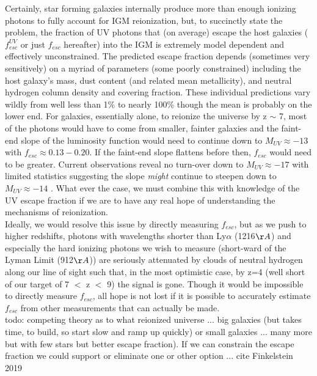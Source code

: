 \documentclass{aastex62}
\begin{document}
Certainly, star forming galaxies internally produce more than enough ionizing photons to fully account for IGM reionization, but, to succinctly state the problem, the fraction of UV photons that (on average) escape the host galaxies ($f^{UV}_{esc}$ or just $f_{esc}$ hereafter) into the IGM is extremely model dependent and effectively unconstrained. The predicted escape fraction depends (sometimes very sensitively) on a myriad of parameters (some poorly constrained) including the host galaxy's mass, dust content (and related mean metallicity), and neutral hydrogen column density and covering fraction. These individual predictions vary wildly from well less than 1\% to nearly 100\% \cite{Zackrisson} though the mean is probably on the lower end. For galaxies, essentially alone, to reionize the universe by z $\sim$ 7, most of the photons would have to come from smaller, fainter galaxies and the faint-end slope of the luminosity function would need to continue down to $M_{UV} \approx -13$ with $f_{esc} \approx 0.13 - 0.20$. If the faint-end slope flattens before then, $f_{esc}$ would need to be greater. Current observations reveal no turn-over down to $M_{UV} \approx -17$ with limited statistics suggesting the slope \textit{might} continue to steepen down to $M_{UV} \approx -14$ \cite{Livermore}. What ever the case, we must combine this with knowledge of the UV escape fraction if we are to have any real hope of understanding the mechanisms of reionization.\\

Ideally, we would resolve this issue by directly measuring $f_{esc}$, but as we push to higher redshifts, photons with wavelengths shorter than Ly$\alpha$ (1216$\AA$) and especially the hard ionizing photons we wish to measure (short-ward of the Lyman Limit (912$\AA$)) are seriously attenuated by clouds of neutral hydrogen along our line of sight such that, in the most optimistic case, by z=4 (well short of our target of 7 $<$ z $<$ 9) the signal is gone. Though it would be impossible to directly measure $f_{esc}$, all hope is not lost if it is possible to accurately estimate $f_{esc}$ from other measurements that can actually be made.\\

{ \color{red} todo: competing theory as to what reionized universe ... big galaxies (but takes time, to build, so start slow and ramp up quickly) or small galaxies ... many more but with few stars but better escape fraction). If we can constrain the escape fraction we could support or eliminate one or other option ... cite Finkelstein 2019}\\
\end{document}
